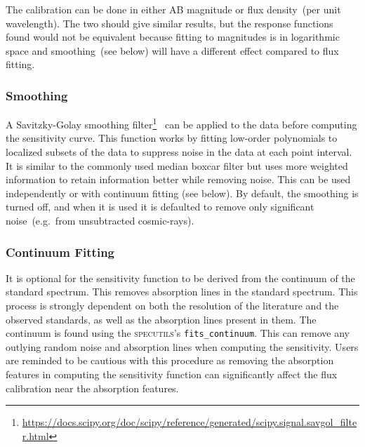 \documentclass[linenumbers, twocolumn]{aastex631}
\begin{document}
The calibration can be done in either AB magnitude or
flux density~(per unit wavelength). The two should give similar
results, but the response functions found would not be equivalent
because fitting to magnitudes is in logarithmic space and smoothing~(see
below) will have a different effect compared to flux fitting.

\subsubsection*{Smoothing}
A Savitzky-Golay smoothing
filter\footnote{\url{https://docs.scipy.org/doc/scipy/reference/generated/scipy.signal.savgol_filter.html}}~\citep[hereafter, SG-filter]{1964AnaCh..36.1627S}
can be applied to the data before computing the sensitivity curve. This function
works by fitting low-order polynomials to localized subsets of the data to
suppress noise in the data at each point interval. It is similar to the
commonly used median boxcar filter but uses more weighted information to
retain information better while removing noise. This can be used independently
or with continuum fitting (see below). By default,
the smoothing is turned off, and when it is used it is defaulted to
remove only significant noise~(e.g.\ from unsubtracted cosmic-rays).

\subsubsection*{Continuum Fitting}
It is optional for the sensitivity function to be derived from the continuum
of the standard spectrum. This removes absorption lines in the standard
spectrum. This process is strongly dependent on both the resolution of the
literature and the observed standards, as well as the absorption lines present
in them. The continuum is found using the \textsc{specutils}'s
\texttt{fits\_continuum}. This can remove any outlying random noise and
absorption lines when computing the  sensitivity. Users are reminded to be
cautious with this procedure as removing the absorption features in computing
the sensitivity function can significantly affect the flux calibration near
the absorption features.

\end{document}
